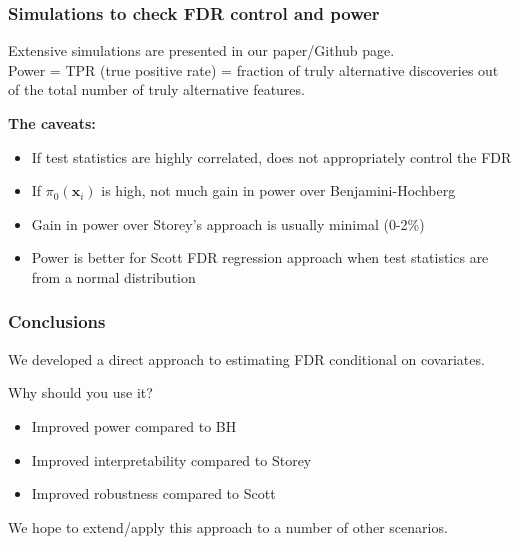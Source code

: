 \documentclass{beamer}
\newcommand{\bx}{\mathbf{x}}
\begin{document}

\begin{frame}
\frametitle{Simulations to check FDR control and power}

Extensive simulations are presented in our paper/Github page.\\ \vspace{0.2cm}
Power = TPR (true positive rate) = fraction of truly alternative discoveries out of the total number of truly alternative features. \\
\vspace{0.5cm}

\textbf{The caveats:}

\begin{itemize}
\item If test statistics are highly correlated, does not appropriately control the FDR
\item If $\pi_0(\bx_i)$ is high, not much gain in power over Benjamini-Hochberg
\item Gain in power over Storey's approach is usually minimal (0-2\%)
\item Power is better for Scott FDR regression approach when test statistics are from a normal distribution
\end{itemize}

\end{frame}


\begin{frame}
\frametitle{Conclusions}

We developed a direct approach to estimating FDR conditional on covariates. \vspace{0.5cm}

Why should you use it?
\begin{itemize}
\item Improved power compared to BH
\item Improved interpretability compared to Storey
\item Improved robustness compared to Scott
\end{itemize} \vspace{0.5cm}

We hope to extend/apply this approach to a number of other scenarios.

\end{frame}
\end{document}
